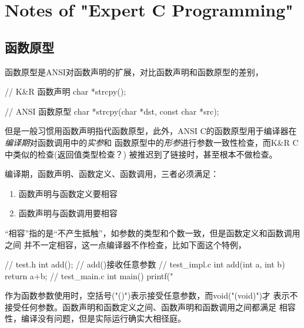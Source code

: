 \section[Notes of "Expert C Programming"]{Notes of "Expert C Programming"}

\subsection[函数原型]{函数原型}
函数原型是ANSI对函数声明的扩展，对比函数声明和函数原型的差别，

\begin{cppcode}
// K&R 函数声明
char *strcpy();

// ANSI 函数原型
char *strcpy(char *dst, const char *src);
\end{cppcode}

但是一般习惯用函数声明指代函数原型，此外，ANSI C的函数原型用于编译器在
\emph{编译期}对函数调用中的\emph{实参}和
函数原型中的\emph{形参}进行参数一致性检查，而K\&R C中类似的检查(返回值类型检查？)
被推迟到了链接时，甚至根本不做检查。

编译期，函数声明、函数定义、函数调用，三者必须满足：
\begin{enumerate}
  \item 函数声明与函数定义要相容
  \item 函数声明与函数调用要相容
\end{enumerate}
“相容”指的是“不产生抵触”，如参数的类型和个数一致，但是函数定义和函数调用之间
并不一定相容，这一点编译器不作检查，比如下面这个特例，

\begin{cppcode}
// test.h
int add(); // add()接收任意参数
// test_impl.c
int add(int a, int b) { return a+b; }
// test_main.c
int main()
{
  printf(" %
}
\end{cppcode}

作为函数参数使用时，空括号("()")表示接受任意参数，而void("(void)")才
表示不接受任何参数。函数声明和函数定义之间、函数声明和函数调用之间都满足
相容性，编译没有问题，但是实际运行确实大相径庭。